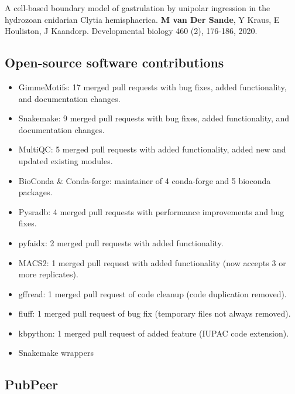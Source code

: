 \noindent
A cell-based boundary model of gastrulation by unipolar ingression in the hydrozoan cnidarian Clytia hemisphaerica. \textbf{M van Der Sande}, Y Kraus, E Houliston, J Kaandorp. Developmental biology 460 (2), 176-186, 2020. \cite{vanderSande2020}


\subsection{Open-source software contributions}

\begin{itemize}
    \item GimmeMotifs: 17 merged pull requests with bug fixes, added functionality, and documentation changes.
    \item Snakemake: 9 merged pull requests with bug fixes, added functionality, and documentation changes.
    \item MultiQC: 5 merged pull requests  with added functionality, added new and updated existing modules.
    \item BioConda \& Conda-forge:  maintainer of 4 conda-forge and 5 bioconda packages.
    \item Pysradb: 4 merged pull requests with performance improvements and bug fixes.
    \item pyfaidx: 2 merged pull requests with added functionality.
    \item MACS2: 1 merged pull request with added functionality (now accepts 3 or more replicates).
    \item gffread: 1 merged pull request of code cleanup (code duplication removed).
    \item fluff: 1 merged pull request of bug fix (temporary files not always removed).
    \item kbpython: 1 merged pull request of added feature (IUPAC code extension).
    \item Snakemake wrappers
    \end{itemize}

\subsection{PubPeer}




